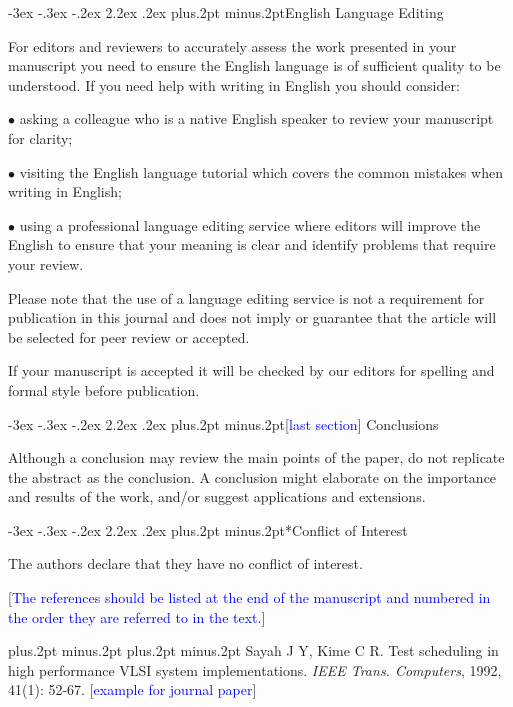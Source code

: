 \documentclass[twoside]{article}
\makeatletter
\def\section{\@startsection{section}{1}{\z@}%
 {-3ex \@plus -.3ex \@minus -.2ex}%
 {2.2ex \@plus.2ex}%
{\normalfont\normalsize\protect\baselineskip=14.5pt plus.2pt minus.2pt\bfseries}}
\makeatother
\begin{document}
\begin{multicols}{2}
\section{English Language Editing}

For editors and reviewers to accurately assess the work presented in your manuscript you need to ensure the English language is of sufficient quality to be understood. If you need help with writing in English you should consider:

$\bullet$ asking a colleague who is a native English speaker to review your manuscript for clarity;

$\bullet$ visiting the English language tutorial which covers the common mistakes when writing in English;

$\bullet$ using a professional language editing service where editors will improve the English to ensure that your meaning is clear and  identify problems that require your review.

Please note that the use of a language editing service is not a requirement for publication in this journal and does not imply or guarantee that the article will be selected for peer review or accepted.

If your manuscript is accepted it will be checked by our editors for spelling and formal style before publication.

\section{[\textcolor{blue}{last section}] Conclusions}

Although a conclusion may review the main points of the paper, do not replicate the abstract as the conclusion. A conclusion might elaborate on the importance and results of the work, and/or suggest applications and extensions.

\section*{Conflict of Interest}

The authors declare that they have no conflict of interest.

\vspace{2mm}

[\textcolor{blue}{The references should be listed at the end of the manuscript and numbered in the order they are referred to in the text.}]

\begin{thebibliography}{99}
\footnotesize
\itemsep=-3pt plus.2pt minus.2pt
\baselineskip=16pt plus.2pt minus.2pt
Sayah J Y, Kime C R. Test scheduling in high performance VLSI system implementations. {\it IEEE Trans. Computers}, 1992, 41(1): 52-67. [\textcolor{blue}{example for journal paper}]


\end{thebibliography}
\end{multicols}
\end{document}
